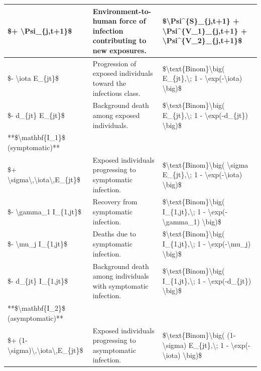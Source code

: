 \documentclass[
]{book}
\begin{document}
\begin{tabular}{l|l|l}
\hline
\$+ \textbackslash{}Psi\_\{j,t+1\}\$ & Environment-to-human force of infection contributing to new exposures. & \$\textbackslash{}Psi\textasciicircum{}\{S\}\_\{j,t+1\} + \textbackslash{}Psi\textasciicircum{}\{V\_1\}\_\{j,t+1\} + \textbackslash{}Psi\textasciicircum{}\{V\_2\}\_\{j,t+1\}\$\\
\hline
\$- \textbackslash{}iota E\_\{jt\}\$ & Progression of exposed individuals toward the infectious class. & \$\textbackslash{}text\{Binom\}\textbackslash{}big( E\_\{jt\},\textbackslash{}; 1 - \textbackslash{}exp(-\textbackslash{}iota) \textbackslash{}big)\$\\
\hline
\$- d\_\{jt\} E\_\{jt\}\$ & Background death among exposed individuals. & \$\textbackslash{}text\{Binom\}\textbackslash{}big( E\_\{jt\},\textbackslash{}; 1 - \textbackslash{}exp(-d\_\{jt\}) \textbackslash{}big)\$\\
\hline
**\$\textbackslash{}mathbf\{I\_1\}\$ (symptomatic)** &  & \\
\hline
\$+ \textbackslash{}sigma\textbackslash{},\textbackslash{}iota\textbackslash{},E\_\{jt\}\$ & Exposed individuals progressing to symptomatic infection. & \$\textbackslash{}text\{Binom\}\textbackslash{}big( \textbackslash{}sigma E\_\{jt\},\textbackslash{}; 1 - \textbackslash{}exp(-\textbackslash{}iota) \textbackslash{}big)\$\\
\hline
\$- \textbackslash{}gamma\_1 I\_\{1,jt\}\$ & Recovery from symptomatic infection. & \$\textbackslash{}text\{Binom\}\textbackslash{}big( I\_\{1,jt\},\textbackslash{}; 1 - \textbackslash{}exp(-\textbackslash{}gamma\_1) \textbackslash{}big)\$\\
\hline
\$- \textbackslash{}mu\_j I\_\{1,jt\}\$ & Deaths due to symptomatic infection. & \$\textbackslash{}text\{Binom\}\textbackslash{}big( I\_\{1,jt\},\textbackslash{}; 1 - \textbackslash{}exp(-\textbackslash{}mu\_j) \textbackslash{}big)\$\\
\hline
\$- d\_\{jt\} I\_\{1,jt\}\$ & Background death among individuals with symptomatic infection. & \$\textbackslash{}text\{Binom\}\textbackslash{}big( I\_\{1,jt\},\textbackslash{}; 1 - \textbackslash{}exp(-d\_\{jt\}) \textbackslash{}big)\$\\
\hline
**\$\textbackslash{}mathbf\{I\_2\}\$ (asymptomatic)** &  & \\
\hline
\$+ (1-\textbackslash{}sigma)\textbackslash{},\textbackslash{}iota\textbackslash{},E\_\{jt\}\$ & Exposed individuals progressing to asymptomatic infection. & \$\textbackslash{}text\{Binom\}\textbackslash{}big( (1-\textbackslash{}sigma) E\_\{jt\},\textbackslash{}; 1 - \textbackslash{}exp(-\textbackslash{}iota) \textbackslash{}big)\$\\

\end{tabular}
\end{document}
